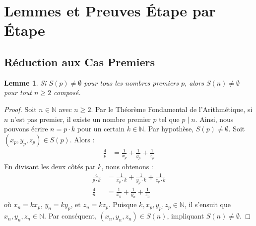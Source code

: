 \documentclass[12pt,a4paper]{article}
\newtheorem{lemma}[theorem]{Lemme}
\begin{document}
\section{Lemmes et Preuves \'Etape par \'Etape}

\subsection{R\'eduction aux Cas Premiers}
\begin{lemma} \label{lem:prime_reduction}
Si $S(p) \neq \emptyset$ pour tous les nombres premiers $p$, alors $S(n) \neq \emptyset$ pour tout $n \ge 2$ compos\'e.
\end{lemma}
\begin{proof}
Soit $n \in \mathbb{N}$ avec $n \ge 2$. Par le Th\'eor\`eme Fondamental de l'Arithm\'etique, si $n$ n'est pas premier, il existe un nombre premier $p$ tel que $p \mid n$. Ainsi, nous pouvons \'ecrire $n = p \cdot k$ pour un certain $k \in \mathbb{N}$.
Par hypoth\`ese, $S(p) \neq \emptyset$. Soit $(x_p, y_p, z_p) \in S(p)$. Alors :
\begin{align}
\frac{4}{p} &= \frac{1}{x_p} + \frac{1}{y_p} + \frac{1}{z_p}
\end{align}
En divisant les deux c\^ot\'es par $k$, nous obtenons :
\begin{align}
\frac{4}{p \cdot k} &= \frac{1}{x_p \cdot k} + \frac{1}{y_p \cdot k} + \frac{1}{z_p \cdot k} \nonumber \\
\frac{4}{n} &= \frac{1}{x_n} + \frac{1}{y_n} + \frac{1}{z_n}
\end{align}
o\`u $x_n = k x_p$, $y_n = k y_p$, et $z_n = k z_p$. Puisque $k, x_p, y_p, z_p \in \mathbb{N}$, il s'ensuit que $x_n, y_n, z_n \in \mathbb{N}$. Par cons\'equent, $(x_n, y_n, z_n) \in S(n)$, impliquant $S(n) \neq \emptyset$.
\end{proof}
\end{document}
